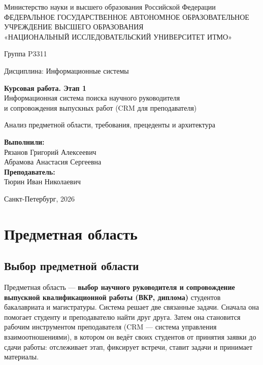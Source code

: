 \documentclass[a4paper,12pt]{article}
\begin{document}
\begin{titlepage}
\centering
\singlespacing
Министерство науки и высшего образования Российской Федерации\\[2pt]
ФЕДЕРАЛЬНОЕ ГОСУДАРСТВЕННОЕ АВТОНОМНОЕ ОБРАЗОВАТЕЛЬНОЕ УЧРЕЖДЕНИЕ ВЫСШЕГО ОБРАЗОВАНИЯ\\[2pt]
«НАЦИОНАЛЬНЫЙ ИССЛЕДОВАТЕЛЬСКИЙ УНИВЕРСИТЕТ ИТМО»

\vspace{2.5cm}
Группа P3311

\vspace{1cm}
Дисциплина: Информационные системы

\vspace{3cm}
{\Large\textbf{Курсовая работа. Этап 1}}\\[8pt]
{\large Информационная система поиска научного руководителя\\
и сопровождения выпускных работ (CRM для преподавателя)}

\vspace{1cm}
Анализ предметной области, требования, прецеденты и архитектура

\vfill
\hfill\begin{minipage}{7.5cm}
\raggedleft
\textbf{Выполнили:}\\
Рязанов Григорий Алексеевич\\
Абрамова Анастасия Сергеевна\\[10pt]
\textbf{Преподаватель:}\\
Тюрин Иван Николаевич
\end{minipage}

\vspace{2cm}
Санкт-Петербург, 2026
\end{titlepage}

\tableofcontents
\newpage

\section{Предметная область}

\subsection{Выбор предметной области}
Предметная область — \textbf{выбор научного руководителя и сопровождение выпускной квалификационной работы (ВКР, диплома)} студентов бакалавриата и магистратуры. Система решает две связанные задачи. Сначала она помогает студенту и преподавателю найти друг друга. Затем она становится рабочим инструментом преподавателя (CRM — система управления взаимоотношениями), в котором он ведёт своих студентов от принятия заявки до сдачи работы: отслеживает этап, фиксирует встречи, ставит задачи и принимает материалы.
\end{document}
